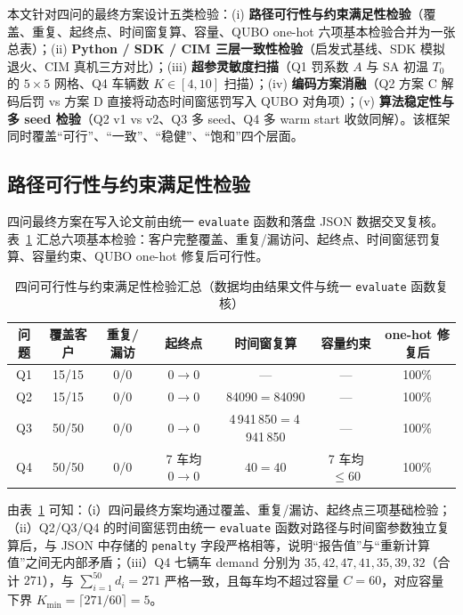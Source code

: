 \documentclass[UTF8,12pt,a4paper]{ctexart}
\begin{document}
本文针对四问的最终方案设计五类检验：(i) \textbf{路径可行性与约束满足性检验}（覆盖、重复、起终点、时间窗复算、容量、QUBO one-hot 六项基本检验合并为一张总表）；(ii) \textbf{Python / SDK / CIM 三层一致性检验}（启发式基线、SDK 模拟退火、CIM 真机三方对比）；(iii) \textbf{超参灵敏度扫描}（Q1 罚系数 $A$ 与 SA 初温 $T_0$ 的 $5\!\times\!5$ 网格、Q4 车辆数 $K\!\in\![4,10]$ 扫描）；(iv) \textbf{编码方案消融}（Q2 方案 C 解码后罚 vs 方案 D 直接将动态时间窗惩罚写入 QUBO 对角项）；(v) \textbf{算法稳定性与多 seed 检验}（Q2 v1 vs v2、Q3 多 seed、Q4 多 warm start 收敛同解）。该框架同时覆盖``可行''、``一致''、``稳健''、``饱和''四个层面。

\subsection{路径可行性与约束满足性检验}
\label{sec:sens-feasibility}

四问最终方案在写入论文前由统一 \texttt{evaluate} 函数和落盘 JSON 数据交叉复核。表~\ref{tab:sens-feasibility} 汇总六项基本检验：客户完整覆盖、重复/漏访问、起终点、时间窗惩罚复算、容量约束、QUBO one-hot 修复后可行性。

\begin{table}[H]
    \centering
    \caption{四问可行性与约束满足性检验汇总（数据均由结果文件与统一 \texttt{evaluate} 函数复核）}
    \label{tab:sens-feasibility}
    \footnotesize
    \begin{tabular}{ccccccc}
        \toprule
        问题 & 覆盖客户 & 重复/漏访 & 起终点 & 时间窗复算 & 容量约束 & one-hot 修复后 \\
        \midrule
        Q1 & 15/15 & 0/0 & $0\!\to\!0$ & --- & --- & 100\% \\
        Q2 & 15/15 & 0/0 & $0\!\to\!0$ & 84090$=$84090 & --- & 100\% \\
        Q3 & 50/50 & 0/0 & $0\!\to\!0$ & 4\,941\,850$=$4\,941\,850 & --- & 100\% \\
        Q4 & 50/50 & 0/0 & 7 车均 $0\!\to\!0$ & $40=40$ & 7 车均 $\le 60$ & 100\% \\
        \bottomrule
    \end{tabular}
\end{table}

由表~\ref{tab:sens-feasibility} 可知：（i）四问最终方案均通过覆盖、重复/漏访、起终点三项基础检验；（ii）Q2/Q3/Q4 的时间窗惩罚由统一 \texttt{evaluate} 函数对路径与时间窗参数独立复算后，与 JSON 中存储的 \texttt{penalty} 字段严格相等，说明``报告值''与``重新计算值''之间无内部矛盾；（iii）Q4 七辆车 demand 分别为 $35,42,47,41,35,39,32$（合计 $271$），与 $\sum_{i=1}^{50}d_i\!=\!271$ 严格一致，且每车均不超过容量 $C\!=\!60$，对应容量下界 $K_{\min}\!=\!\lceil 271/60\rceil\!=\!5$。
\end{document}
